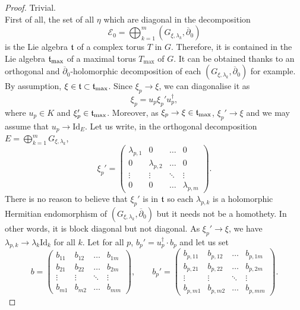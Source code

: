 \documentclass[10pt,a4paper]{amsart}
\newcommand{\E}{\mathcal{E}}
\newcommand{\Id}{\mathrm{Id}}
\newcommand{\dbar}{\overline{\partial}}
\begin{document}
\begin{proof}
\noindent{} Trivial.\\

\noindent{} First of all, the set of all $\eta$ which are diagonal in the decomposition
$$
\E_0 = \bigoplus_{k = 1}^m (G_{\xi,\lambda_k},\dbar_0)
$$
is the Lie algebra $\frak{t}$ of a complex torus $T$ in $G$. Therefore, it is contained in the Lie algebra $\frak{t}_{\max}$ of a maximal torus $T_{\max}$ of $G$. It can be obtained thanks to an orthogonal and $\dbar_0$-holomorphic decomposition of each $(G_{\xi,\lambda_k},\dbar_0)$ for example. By assumption, $\xi \in \frak{t} \subset \frak{t}_{\max}$. Since $\xi_p \rightarrow \xi$, we can diagonalise it as
$$
\xi_p = u_p\xi_p'u_p^\dagger,
$$
where $u_p \in K$ and $\xi_p' \in \frak{t}_{\max}$. Moreover, as $\xi_p \rightarrow \xi \in \frak{t}_{\max}$, $\xi_p' \rightarrow \xi$ and we may assume that $u_p \rightarrow \Id_E$. Let us write, in the orthogonal decomposition $E = \bigoplus_{k = 1}^m G_{\xi,\lambda_k}$,
$$
\xi_p' =
\begin{pmatrix}
    \lambda_{p,1} & 0 & \hdots & 0\\
    0 & \lambda_{p,2} & \hdots & 0\\
    \vdots & \vdots & \ddots & \vdots\\
    0 & 0 & \hdots & \lambda_{p,m}
\end{pmatrix}.
$$
There is no reason to believe that $\xi_p'$ is in $\frak{t}$ so each $\lambda_{p,k}$ is a holomorphic Hermitian endomorphism of $(G_{\xi,\lambda_k},\dbar_0)$ but it needs not be a homothety. In other words, it is block diagonal but not diagonal. As $\xi_p' \rightarrow \xi$, we have $\lambda_{p,k} \rightarrow \lambda_k\Id_k$ for all $k$. Let for all $p$, $b_p' = u_p^\dagger \cdot b_p$ and let us set
$$
b =
\begin{pmatrix}
    b_{11} & b_{12} & \hdots & b_{1m}\\
    b_{21} & b_{22} & \hdots & b_{2m}\\
    \vdots & \vdots & \ddots & \vdots\\
    b_{m1} & b_{m2} & \hdots & b_{mm}
\end{pmatrix}, \qquad
b_p' = 
\begin{pmatrix}
    b_{p,11} & b_{p,12} & \hdots & b_{p,1m}\\
    b_{p,21} & b_{p,22} & \hdots & b_{p,2m}\\
    \vdots & \vdots & \ddots & \vdots\\
    b_{p,m1} & b_{p,m2} & \hdots & b_{p,mm}
\end{pmatrix}.
$$
\end{proof}
\end{document}
